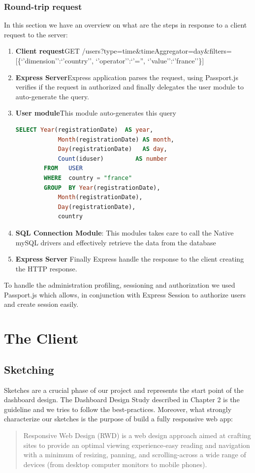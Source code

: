 \documentclass[a4paper,13pt]{report}
\begin{document}
    \subsection{Round-trip request}
    In this section we have an overview on what are the steps in response to a client request to the server:
    \begin{enumerate}
        \item \textbf{Client request}\newline GET /users?type=time\&timeAggregator=day\&filters=[\{`'dimension'':`'country'', `'operator'':`'='', `'value'':`'france''\}] 
        \item \textbf{Express Server}\newline Express application parses the request, using Passport.js verifies if the request in authorized and finally delegates the user module to auto-generate the query.
        \item \textbf{User module}\newline This module auto-generates this query 
        \begin{lstlisting}[language=SQL]
        SELECT Year(registrationDate)  AS year, 
            Month(registrationDate) AS month, 
            Day(registrationDate)   AS day, 
            Count(iduser)         AS number 
        FROM   USER 
        WHERE  country = "france" 
        GROUP  BY Year(registrationDate), 
            Month(registrationDate), 
            Day(registrationDate), 
            country 
        \end{lstlisting}
        \item \textbf{SQL Connection Module}:
            This modules takes care to call the Native mySQL drivers and effectively retrieve the data from the database
        \item  \textbf{Express Server}
            Finally Express handle the response to the client creating the HTTP response.
    \end{enumerate}


    To handle the administration profiling, sessioning and authorization we used Passport.js which allows, in conjunction with Express Session to authorize users and create session easily.
\chapter{The Client}
 \section{Sketching}
Sketches are a crucial phase of our project and represents the start point of the dashboard design. The Dashboard Design Study described in Chapter 2 is the guideline and we tries to follow the best-practices.
Moreover, what strongly characterize our sketches is the purpose of build a fully responsive web app: 
\begin{quote} 
    Responsive Web Design (RWD) is a web design approach aimed at crafting sites to provide an optimal viewing experience-easy reading and navigation with a minimum of resizing, panning, and scrolling-across a wide range of devices (from desktop computer monitors to mobile phones).
\end{quote}
\end{document}
